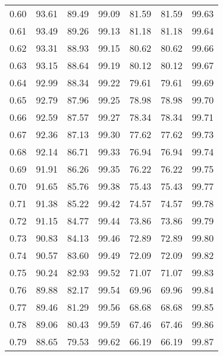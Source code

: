 \begin{tabular}{|c|c|c|c|c|c|c|}
      0.60 &     93.61 &     89.49 &      99.09 &   81.59 &      81.59 &         99.63 \\
      0.61 &     93.49 &     89.26 &      99.13 &   81.18 &      81.18 &         99.64 \\
      0.62 &     93.31 &     88.93 &      99.15 &   80.62 &      80.62 &         99.66 \\
      0.63 &     93.15 &     88.64 &      99.19 &   80.12 &      80.12 &         99.67 \\
      0.64 &     92.99 &     88.34 &      99.22 &   79.61 &      79.61 &         99.69 \\
      0.65 &     92.79 &     87.96 &      99.25 &   78.98 &      78.98 &         99.70 \\
      0.66 &     92.59 &     87.57 &      99.27 &   78.34 &      78.34 &         99.71 \\
      0.67 &     92.36 &     87.13 &      99.30 &   77.62 &      77.62 &         99.73 \\
      0.68 &     92.14 &     86.71 &      99.33 &   76.94 &      76.94 &         99.74 \\
      0.69 &     91.91 &     86.26 &      99.35 &   76.22 &      76.22 &         99.75 \\
      0.70 &     91.65 &     85.76 &      99.38 &   75.43 &      75.43 &         99.77 \\
      0.71 &     91.38 &     85.22 &      99.42 &   74.57 &      74.57 &         99.78 \\
      0.72 &     91.15 &     84.77 &      99.44 &   73.86 &      73.86 &         99.79 \\
      0.73 &     90.83 &     84.13 &      99.46 &   72.89 &      72.89 &         99.80 \\
      0.74 &     90.57 &     83.60 &      99.49 &   72.09 &      72.09 &         99.82 \\
      0.75 &     90.24 &     82.93 &      99.52 &   71.07 &      71.07 &         99.83 \\
      0.76 &     89.88 &     82.17 &      99.54 &   69.96 &      69.96 &         99.84 \\
      0.77 &     89.46 &     81.29 &      99.56 &   68.68 &      68.68 &         99.85 \\
      0.78 &     89.06 &     80.43 &      99.59 &   67.46 &      67.46 &         99.86 \\
      0.79 &     88.65 &     79.53 &      99.62 &   66.19 &      66.19 &         99.87 \\

\end{tabular}
